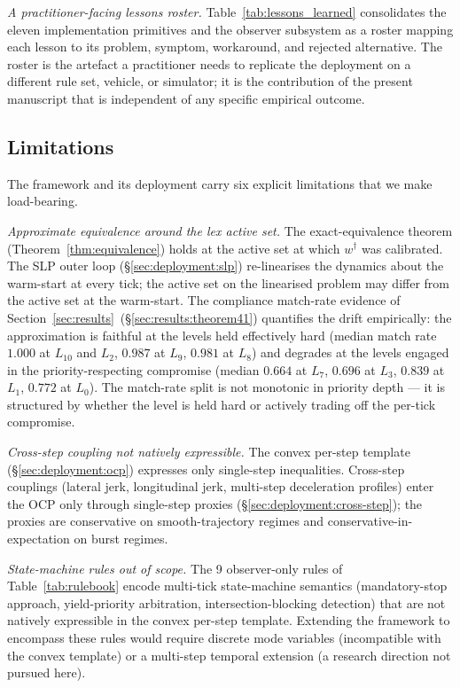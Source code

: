\emph{A practitioner-facing lessons roster.} Table~\ref{tab:lessons_learned} consolidates the eleven implementation primitives and the observer subsystem as a roster mapping each lesson to its problem, symptom, workaround, and rejected alternative. The roster is the artefact a practitioner needs to replicate the deployment on a different rule set, vehicle, or simulator; it is the contribution of the present manuscript that is independent of any specific empirical outcome.

\subsection{Limitations}
\label{sec:discussion:limitations}

The framework and its deployment carry six explicit limitations that we make load-bearing.

\emph{Approximate equivalence around the lex active set.} The exact-equivalence theorem (Theorem~\ref{thm:equivalence}) holds at the active set at which $w^{\dagger}$ was calibrated. The SLP outer loop (\S\ref{sec:deployment:slp}) re-linearises the dynamics about the warm-start at every tick; the active set on the linearised problem may differ from the active set at the warm-start. The compliance match-rate evidence of Section~\ref{sec:results}~(\S\ref{sec:results:theorem41}) quantifies the drift empirically: the approximation is faithful at the levels held effectively hard (median match rate $1.000$ at $L_{10}$ and $L_2$, $0.987$ at $L_9$, $0.981$ at $L_8$) and degrades at the levels engaged in the priority-respecting compromise (median $0.664$ at $L_7$, $0.696$ at $L_3$, $0.839$ at $L_1$, $0.772$ at $L_0$). The match-rate split is not monotonic in priority depth --- it is structured by whether the level is held hard or actively trading off the per-tick compromise.

\emph{Cross-step coupling not natively expressible.} The convex per-step template (\S\ref{sec:deployment:ocp}) expresses only single-step inequalities. Cross-step couplings (lateral jerk, longitudinal jerk, multi-step deceleration profiles) enter the OCP only through single-step proxies (\S\ref{sec:deployment:cross-step}); the proxies are conservative on smooth-trajectory regimes and conservative-in-expectation on burst regimes.

\emph{State-machine rules out of scope.} The 9 observer-only rules of Table~\ref{tab:rulebook} encode multi-tick state-machine semantics (mandatory-stop approach, yield-priority arbitration, intersection-blocking detection) that are not natively expressible in the convex per-step template. Extending the framework to encompass these rules would require discrete mode variables (incompatible with the convex template) or a multi-step temporal extension (a research direction not pursued here).

